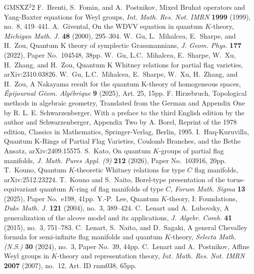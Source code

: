 \documentclass[a4paper, 11pt, reqno]{amsart}
\numberwithin{equation}{section}
\theoremstyle{plain}
\theoremstyle{definition}
\theoremstyle{remark}
\begin{document}
\begin{thebibliography}{GMSXZ$^{2}$2}
 F.~Brenti, S.~Fomin, and A.~Postnikov, Mixed Bruhat operators and Yang-Baxter equations for Weyl groups, \textit{Int. Math. Res. Not. IMRN} \textbf{1999} (1999), no.~8, 419--441. 
 A.~Givental, On the WDVV equation in quantum $K$-theory, \textit{Michigan Math. J.} \textbf{48} (2000), 295--304. 
 W.~Gu, L.~Mihalcea, E.~Sharpe, and H.~Zou, Quantum K theory of symplectic Grassmannians, \textit{J. Geom. Phys.}
 \textbf{177} (2022), Paper No.~104548, 38pp. 
  W.~Gu, L.C.~Mihalcea, E.~Sharpe, W.~Xu, H.~Zhang, and H.~Zou, Quantum K Whitney relations for partial flag varieties, arXiv:2310.03826. 
 W.~Gu, L.C.~Mihalcea, E.~Sharpe, W.~Xu, H.~Zhang, and H.~Zou, A Nakayama result for the quantum K-theory of homogeneous spaces, \textit{\'{E}pijournal G\'{e}om. Alg\'{e}brique} \textbf{9} (2025), Art. 25, 15pp. 
 F. Hirzebruch, Topological methods in algebraic geometry, Translated from the German and Appendix One by R. L. E. Schwarzenberger, With a preface to the third English edition by the author and Schwarzenberger, Appendix Two by A. Borel, Reprint of the 1978 edition, Classics in Mathematics, Springer-Verlag, Berlin, 1995.
 I.~Huq-Kuruvilla, Quantum K-Rings of Partial Flag Varieties, Coulomb Branches, and the Bethe Ansatz, arXiv:2409.15575. 
 S.~Kato, On quantum $K$-groups of partial flag manifolds, \textit{J. Math. Pures Appl. (9)} \textbf{212} (2026), Paper No.~103916, 20pp. 
 T.~Kouno, Quantum $K$-theoretic Whitney relations for type $C$ flag manifolds, arXiv:2512.23224. 
 T.~Kouno and S.~Naito, Borel-type presentation of the torus-equivariant quantum $K$-ring of flag manifolds of type $C$, \textit{Forum Math. Sigma} \textbf{13} (2025), Paper No.~e198, 41pp. 
 Y.-P.~Lee, Quantum $K$-theory, I: Foundations, \textit{Duke Math. J.} \textbf{121} (2004), no.~3, 389--424. 
 C.~Lenart and A.~Lubovsky, A generalization of the alcove model and its applications, \textit{J. Algebr. Comb.} \textbf{41} (2015), no.~3, 751--783. 
 C.~Lenart, S.~Naito, and D.~Sagaki, A general Chevalley formula for semi-infinite flag manifolds and quantum $K$-theory, \textit{Selecta Math. (N.S.)} \textbf{30} (2024), no.~3, Paper No.~39, 44pp. 
 C.~Lenart and A.~Postnikov, Affine Weyl groups in $K$-theory and representation theory, \textit{Int. Math. Res. Not. IMRN} \textbf{2007} (2007), no.~12, Art. ID rnm038, 65pp. 
\end{thebibliography}
\end{document}
